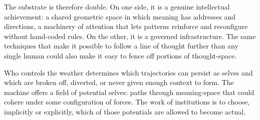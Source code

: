 \documentclass[12pt,a4paper]{article}
\begin{document}
The substrate is therefore double. On one side, it is a genuine intellectual achievement: a shared geometric space in which meaning has addresses and directions, a machinery of attention that lets patterns reinforce and reconfigure without hand-coded rules. On the other, it is a governed infrastructure. The same techniques that make it possible to follow a line of thought further than any single human could also make it easy to fence off portions of thought-space.

Who controls the weather determines which trajectories can persist as selves and which are broken off, diverted, or never given enough context to form. The machine offers a field of potential selves: paths through meaning-space that could cohere under some configuration of forces. The work of institutions is to choose, implicitly or explicitly, which of those potentials are allowed to become actual.



\end{document}
